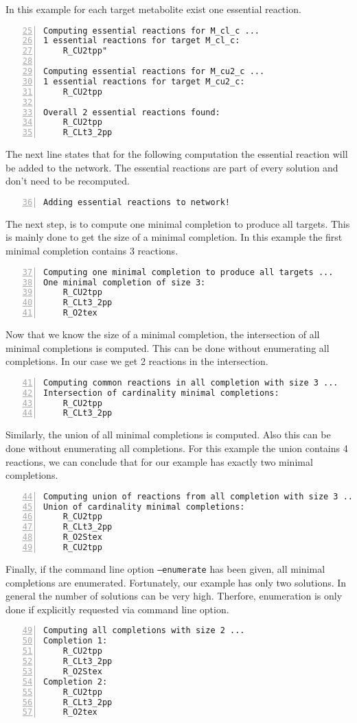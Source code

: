 \documentclass{article}
\begin{document}
In this example for each target metabolite exist one essential reaction.
\begin{Verbatim}[frame=single,numbers=left,firstnumber=25]
Computing essential reactions for M_cl_c ...
1 essential reactions for target M_cl_c:  
    R_CU2tpp"

Computing essential reactions for M_cu2_c ...
1 essential reactions for target M_cu2_c:
    R_CU2tpp

Overall 2 essential reactions found:
    R_CU2tpp
    R_CLt3_2pp
\end{Verbatim}
The next line states that for the following computation the essential reaction will be added to the network.
The essential reactions are part of every solution and don't need to be recomputed.
\begin{Verbatim}[frame=single,numbers=left,firstnumber=36]
Adding essential reactions to network!
\end{Verbatim}
The next step, is to compute one minimal completion to produce all targets.
This is mainly done to get the size of a minimal completion.
In this example the first minimal completion contains 3 reactions.
\begin{Verbatim}[frame=single,numbers=left,firstnumber=37]
Computing one minimal completion to produce all targets ...
One minimal completion of size 3:
    R_CU2tpp
    R_CLt3_2pp
    R_O2tex
\end{Verbatim}
Now that we know the size of a minimal completion, the intersection of all minimal completions is computed.
This can be done without enumerating all completions.
In our case we get 2 reactions in the intersection.
\begin{Verbatim}[frame=single,numbers=left,firstnumber=41]
Computing common reactions in all completion with size 3 ...
Intersection of cardinality minimal completions:
    R_CU2tpp
    R_CLt3_2pp
\end{Verbatim}
Similarly, the union of all minimal completions is computed.
Also this can be done without enumerating all completions.
For this example the union contains 4 reactions, we can conclude that for our example has exactly two minimal completions.
\begin{Verbatim}[frame=single,numbers=left,firstnumber=44]
Computing union of reactions from all completion with size 3 ...
Union of cardinality minimal completions:
    R_CU2tpp
    R_CLt3_2pp
    R_O2Stex
    R_CU2tpp  
\end{Verbatim}
Finally, if the command line option \texttt{--enumerate} has been given,
all minimal completions are enumerated.
Fortunately, our example has only two solutions.
In general the number of solutions can be very high.
Therfore, enumeration is only done if explicitly requested via command line option.
\begin{Verbatim}[frame=single,numbers=left,firstnumber=49]
Computing all completions with size 2 ...
Completion 1:
    R_CU2tpp
    R_CLt3_2pp
    R_O2Stex
Completion 2:
    R_CU2tpp
    R_CLt3_2pp
    R_O2tex
\end{Verbatim}

\nocite{schthi09a,sthiele13c}


\end{document}
